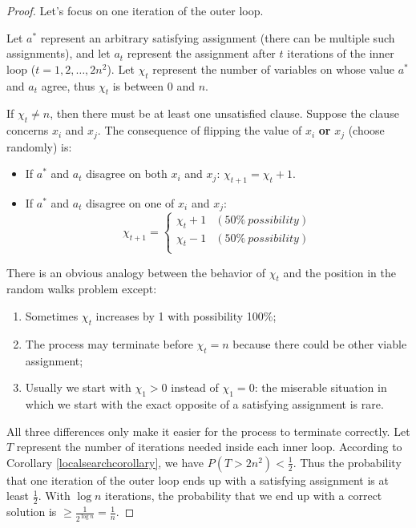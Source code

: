 \begin{proof}
Let's focus on one iteration of the outer loop. 

Let $a^*$ represent an arbitrary satisfying assignment (there can be multiple such assignments), and let $a_t$ represent the assignment after $t$ iterations of the inner loop ($t=1,2,\dots,2n^2$). Let $\chi_t$ represent the number of variables on whose value $a^*$ and $a_t$ agree, thus $\chi_t$ is between 0 and $n$. 

If $\chi_t\neq n$, then there must be at least one unsatisfied clause. Suppose the clause concerns $x_i$ and $x_j$. The consequence of flipping the value of $x_i$ \textbf{or} $x_j$ (choose randomly) is:
\begin{itemize}
\item If $a^*$ and $a_t$ disagree on both $x_i$ and $x_j$: $\chi_{t+1}=\chi_t+1$.
\item If $a^*$ and $a_t$ disagree on one of $x_i$ and $x_j$:
\begin{equation*}
\chi_{t+1}=\begin{cases}
\chi_t+1&(50\%\:possibility)\\
\chi_t-1&(50\%\:possibility)\\
\end{cases}
\end{equation*}
\end{itemize}
There is an obvious analogy between the behavior of $\chi_t$ and the position in the random walks problem except:
\begin{enumerate}
\item Sometimes $\chi_t$ increases by 1 with possibility 100\%;
\item The process may terminate before $\chi_t=n$ because there could be other viable assignment;
\item Usually we start with $\chi_1>0$ instead of $\chi_1=0$: the miserable situation in which we start with the exact opposite of a satisfying assignment is rare. 
\end{enumerate}
All three differences only make it easier for the process to terminate correctly. Let $T$ represent the number of iterations needed inside each inner loop. According to Corollary \ref{localsearchcorollary}, we have $P(T>2n^2)<\frac{1}{2}$. Thus the probability that one iteration of the outer loop ends up with a satisfying assignment is at least $\frac{1}{2}$. With $\log n$ iterations, the probability that we end up with a correct solution is $\geq\frac{1}{2^{\log n}}=\frac{1}{n}.$


\end{proof}
\ifx\PREAMBLE\undefined

\fi